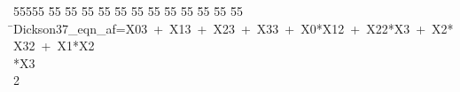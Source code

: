 %
%
\begin{tabbing}
55555 \= 55 \= 55 \= 55 \= 55 \= 55 \= 55 \= 55 \= 55 \= 55 \= 55 \= 55 \= 55 \= \>Dickson37\_eqn\_af=X03\ +\ X13\ +\ X23\ +\ X33\ +\ X0*X12\ +\ X22*X3\ +\ X2*X32\ +\ X1*X2\\[0pt]
\>*X3\\[0pt]
2\>\end{tabbing}
